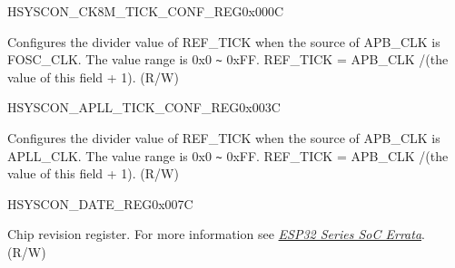     \begin{register}{H}{SYSCON\_CK8M\_TICK\_CONF\_REG}{0x000C}\label{regdesc:SYSCONCK8MTICKCONFREG}
    \regnewline%
    \begin{regdesc}\begin{reglist}
    \label{fielddesc:SYSCONCK8MTICKNUM}\item [SYSCON\_CK8M\_TICK\_NUM] Configures the divider value of REF\_TICK when the source of APB\_CLK is FOSC\_CLK. The value range is 0x0 \verb+~+ 0xFF. REF\_TICK = APB\_CLK /(the value of this field + 1). (R/W)
    \end{reglist}\end{regdesc}
    \end{register}


    \begin{register}{H}{SYSCON\_APLL\_TICK\_CONF\_REG}{0x003C}\label{regdesc:SYSCONAPLLTICKCONFREG}
    \regnewline%
    \begin{regdesc}\begin{reglist}
    \label{fielddesc:SYSCONAPLLTICKNUM}\item [SYSCON\_APLL\_TICK\_NUM] Configures the divider value of REF\_TICK when the source of APB\_CLK is APLL\_CLK. The value range is 0x0 \verb+~+ 0xFF. REF\_TICK = APB\_CLK /(the value of this field + 1). (R/W)
    \end{reglist}\end{regdesc}
    \end{register}


    \begin{register}{H}{SYSCON\_DATE\_REG}{0x007C}\label{regdesc:SYSCONDATEREG}
    \regnewline%
    \begin{regdesc}\begin{reglist}
    \label{fielddesc:SYSCONDATE}\item [SYSCON\_DATE] Chip revision register. For more information see \href{https://www.espressif.com/sites/default/files/documentation/esp32\_errata\_en.pdf}{\it{ESP32 Series SoC Errata}}. (R/W)
    \end{reglist}\end{regdesc}
    \end{register}
